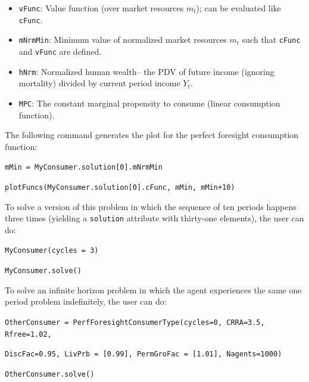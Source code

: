 \documentclass[12pt,titlepage,letterpaper]{econtex}
\begin{document}
{\begin{itemize}
\item \texttt{vFunc}: Value function (over market resources $m_t$); can be evaluated like \texttt{cFunc}.

\item \texttt{mNrmMin}: Minimum value of normalized market resources $m_t$ such that \texttt{cFunc} and \texttt{vFunc} are defined. 

\item \texttt{hNrm}: Normalized human wealth-- the PDV of future income (ignoring mortality) divided by current period income $Y_t$.

\item \texttt{MPC}: The constant marginal propensity to consume (linear consumption function).

\end{itemize}

The following command generates the plot for the perfect foresight consumption function:
	
\vspace{0.25cm}
		
\noindent \texttt{mMin = MyConsumer.solution[0].mNrmMin} 

\noindent \texttt{plotFuncs(MyConsumer.solution[0].cFunc,  mMin,  mMin+10)}
	
\vspace{0.25cm}

To solve a version of this problem in which the sequence of ten periods happens three times (yielding a \texttt{solution} attribute with thirty-one elements), the user can do:

\vspace{0.25cm}

\noindent \texttt{MyConsumer(cycles = 3)}

\noindent \texttt{MyConsumer.solve()}

\vspace{0.25cm}

To solve an infinite horizon problem in which the agent experiences the same one period problem indefinitely, the user can do:

\vspace{0.25cm}

\noindent \texttt{OtherConsumer = PerfForesightConsumerType(cycles=0, CRRA=3.5, Rfree=1.02,}

\texttt{DiscFac=0.95, LivPrb = [0.99], PermGroFac = [1.01], Nagents=1000)}

\noindent \texttt{OtherConsumer.solve()}  

}
\end{document}
